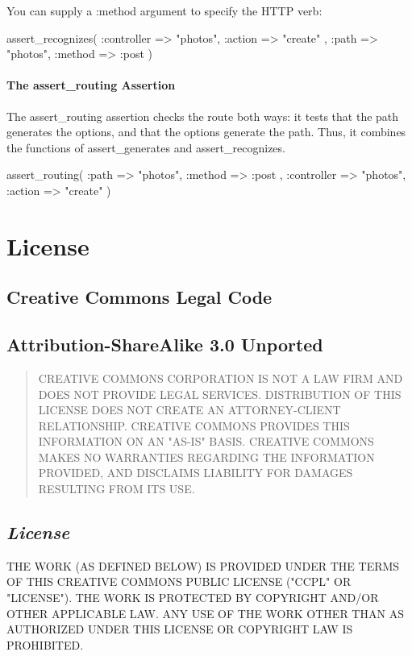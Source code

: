 \documentclass[10pt]{book}
\newenvironment{code}{%
  \scriptsize
    \verbatim
}{%
    \endverbatim
    \newline
}
\begin{document}
You can supply a :method argument to specify the HTTP verb:
{\scriptsize
\begin{code}
assert_recognizes({ :controller => "photos", 
:action => "create" }, { :path => "photos", :method => :post })
\end{code}
}

\subsubsection{ The assert\_routing Assertion}

The assert\_routing assertion checks the route both ways: it  tests that the path generates the options, and that the options generate  the path. Thus, it combines the functions of assert\_generates and assert\_recognizes.
{\scriptsize
\begin{code}
assert_routing({ :path => "photos", :method => :post }, 
{ :controller => "photos", :action => "create" })
\end{code}
}

\chapter{License}

\section*{Creative Commons Legal Code}

\section*{Attribution-ShareAlike 3.0 Unported}

\begin{quotation}           CREATIVE COMMONS CORPORATION IS NOT A LAW FIRM AND DOES           NOT PROVIDE LEGAL SERVICES. DISTRIBUTION OF THIS LICENSE           DOES NOT CREATE AN ATTORNEY-CLIENT RELATIONSHIP. CREATIVE           COMMONS PROVIDES THIS INFORMATION ON AN "AS-IS" BASIS.           CREATIVE COMMONS MAKES NO WARRANTIES REGARDING THE           INFORMATION PROVIDED, AND DISCLAIMS LIABILITY FOR DAMAGES           RESULTING FROM ITS USE.         
\end{quotation}

\section*{\emph{License}}

THE WORK (AS DEFINED BELOW) IS PROVIDED UNDER THE TERMS         OF THIS CREATIVE COMMONS PUBLIC LICENSE ("CCPL" OR         "LICENSE"). THE WORK IS PROTECTED BY COPYRIGHT AND/OR OTHER         APPLICABLE LAW. ANY USE OF THE WORK OTHER THAN AS         AUTHORIZED UNDER THIS LICENSE OR COPYRIGHT LAW IS         PROHIBITED.
\end{document}
